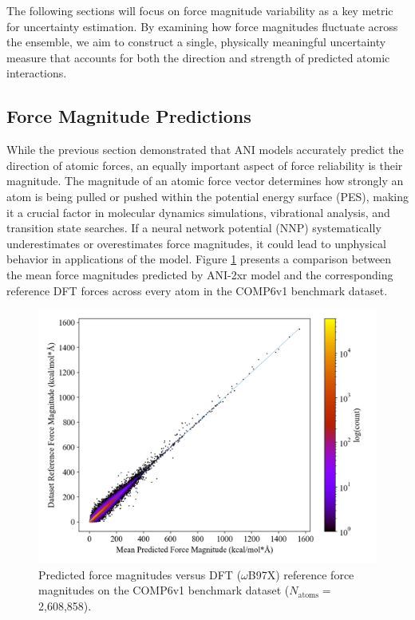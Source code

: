 The following sections will focus on force magnitude variability as a key metric for uncertainty estimation. 
By examining how force magnitudes fluctuate across the ensemble, we aim to construct a single, physically meaningful uncertainty measure that accounts for both the direction and strength of predicted atomic interactions.

\subsection{Force Magnitude Predictions}
\label{subsec:force_magnitudes}

While the previous section demonstrated that ANI models accurately predict the direction of atomic forces, an equally important aspect of force reliability is their magnitude. 
The magnitude of an atomic force vector determines how strongly an atom is being pulled or pushed within the potential energy surface (PES), making it a crucial factor in molecular dynamics simulations, vibrational analysis, and transition state searches. 
If a neural network potential (NNP) systematically underestimates or overestimates force magnitudes, it could lead to unphysical behavior in applications of the model.
Figure \ref{fig:2xr_comp6v1-forces-ani_vs_ref} presents a comparison between the mean force magnitudes predicted by ANI-2xr model and the corresponding reference DFT forces across every atom in the COMP6v1 benchmark dataset. 

\begin{figure}[H]
    \centering
    \includegraphics[width=1\linewidth]{Images/2xr_forces/2xr_comp6v1_force-dft-vs-mean_ani.png}
    \caption[Mean predicted atomic force magnitude versus DFT reference (COMP6v1)]{Predicted force magnitudes versus DFT ($\omega$B97X) reference force magnitudes on the COMP6v1 benchmark dataset ($N_\text{atoms}=$ 2,608,858).}
    \label{fig:2xr_comp6v1-forces-ani_vs_ref}
\end{figure}

